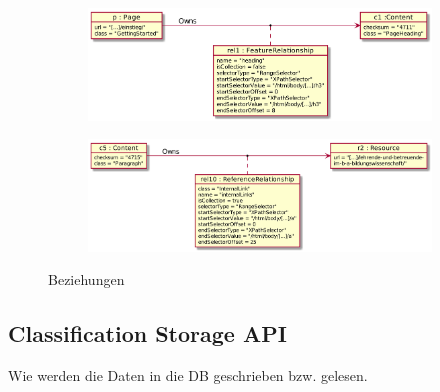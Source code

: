             \begin{figure}
                \centering
                \begin{subfigure}{\textwidth}
                    \includegraphics[width=\textwidth]{../resources/db-data-model/example/p-c1.png}
                \end{subfigure}

                \begin{subfigure}{\textwidth}
                    \includegraphics[width=\textwidth]{../resources/db-data-model/example/c5-r2.png}
                \end{subfigure}
                \caption{Beziehungen}
                \label{image:dbDataModelExampleRelationships}
            \end{figure}

        \subsection{Classification Storage API}
            Wie werden die Daten in die DB geschrieben bzw. gelesen.

